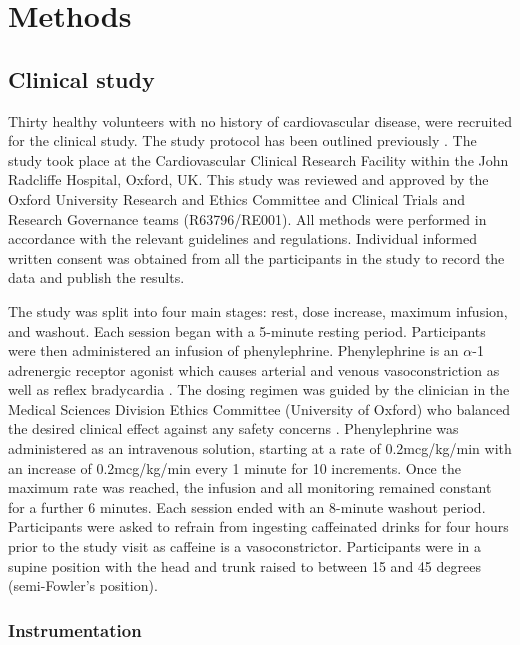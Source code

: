 \documentclass[fleqn,10pt]{wlscirep}
\begin{document}
\section{Methods}


\subsection{Clinical study}

Thirty healthy volunteers with no history of cardiovascular disease, were recruited for the clinical study. The study protocol has been outlined previously \cite{Harford2020,Finnegan2021}. The study took place at the Cardiovascular Clinical Research Facility within the John Radcliffe Hospital, Oxford, UK. This study was reviewed and approved by the Oxford University Research and Ethics Committee and Clinical Trials and Research Governance teams (R63796/RE001). All methods were performed in accordance with the relevant guidelines and regulations. Individual informed written consent was obtained from all the participants in the study to record the data and publish the results.

The study was split into four main stages: rest, dose increase, maximum infusion, and washout. Each session began with a 5-minute resting period. Participants were then administered an infusion of phenylephrine. Phenylephrine is an $\alpha$-1 adrenergic receptor agonist which causes arterial and venous vasoconstriction as well as reflex bradycardia \cite{Richards2019}. The dosing regimen was guided by the clinician in the Medical Sciences Division Ethics Committee (University of Oxford) who balanced the desired clinical effect against any safety concerns \cite{Harford2020}. Phenylephrine was administered as an intravenous solution, starting at a rate of 0.2mcg/kg/min with an increase of 0.2mcg/kg/min every 1 minute for 10 increments. Once the maximum rate was reached, the infusion and all monitoring remained constant for a further 6 minutes. Each session ended with an 8-minute washout period. Participants were asked to refrain from ingesting caffeinated drinks for four hours prior to the study visit as caffeine is a vasoconstrictor. Participants were in a supine position with the head and trunk raised to between 15 and 45 degrees (semi-Fowler's position).


\subsubsection*{Instrumentation}
\end{document}
